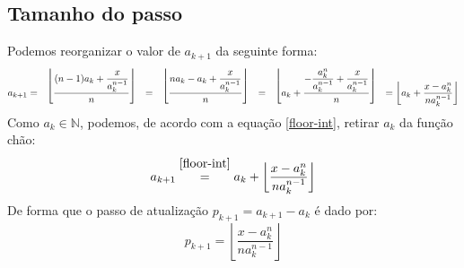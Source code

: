 \subsection*{Tamanho do passo}

Podemos reorganizar o valor de $a_{k+1}$ da seguinte forma:
\[
  a_{k+1}
  = \bracketize[.75em]{\lfloor}{\rfloor}{
      \dfrac{(n-1) a_k + \dfrac{x}{a_k^{n-1}}}{n}
    }
  = \bracketize[.75em]{\lfloor}{\rfloor}{
      \dfrac{n a_k - a_k + \dfrac{x}{a_k^{n-1}}}{n}
    }
  = \bracketize[.75em]{\lfloor}{\rfloor}{
      a_k +
      \dfrac{- \dfrac{a_k^n}{a_k^{n-1}} + \dfrac{x}{a_k^{n-1}}}
            {n}
    }
  = \left\lfloor
      a_k +
      \dfrac{x - a_k^n}{na_k^{n-1}}
    \right\rfloor
\]
Como $a_k \in \mathds{N}$, podemos,
de acordo com a equação \eqref{floor-int},
retirar $a_k$ da função chão:
\[
    a_{k+1}
  \stackfirst{\eqref{floor-int}}{=}
    a_k +
    \left\lfloor
      \dfrac{x - a_k^n}{na_k^{n-1}}
    \right\rfloor
\]
De forma que o passo de atualização $p_{k+1} = a_{k+1} - a_{k}$
é dado por:
\[
  p_{k+1} = \left\lfloor \dfrac{x - a_k^n}{na_k^{n-1}} \right\rfloor
\]
